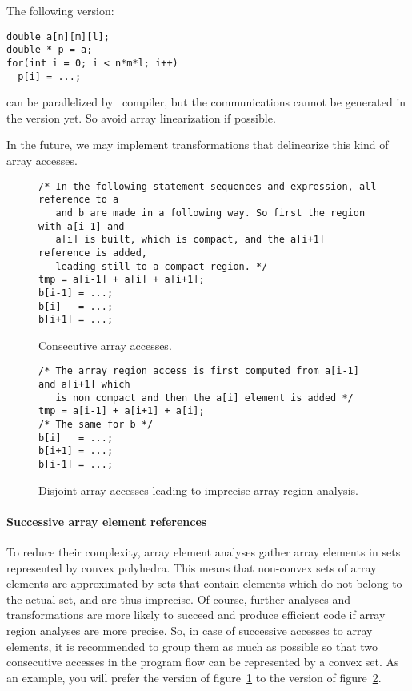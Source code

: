 \documentclass[a4paper]{article}
\begin{document}
The following version:
\begin{lstlisting}
double a[n][m][l];
double * p = a;
for(int i = 0; i < n*m*l; i++)
  p[i] = ...;
\end{lstlisting}
can be parallelized by \Apfa\ \Aopenmp compiler, but the
communications cannot be generated in the \Agpu version yet. So avoid
array linearization if possible.

In the future, we may implement transformations that delinearize this kind
of array accesses.

\begin{figure}
  \centering
  \begin{lstlisting}
/* In the following statement sequences and expression, all reference to a
   and b are made in a following way. So first the region with a[i-1] and
   a[i] is built, which is compact, and the a[i+1] reference is added,
   leading still to a compact region. */
tmp = a[i-1] + a[i] + a[i+1];
b[i-1] = ...;
b[i]   = ...;
b[i+1] = ...;
  \end{lstlisting}
  \caption{Consecutive array accesses.}
  \label{fig:consecutive_array_accesses}
\end{figure}

\begin{figure}
  \centering
  \begin{lstlisting}
/* The array region access is first computed from a[i-1] and a[i+1] which
   is non compact and then the a[i] element is added */
tmp = a[i-1] + a[i+1] + a[i];
/* The same for b */
b[i]   = ...;
b[i+1] = ...;
b[i-1] = ...;
  \end{lstlisting}
  \caption{Disjoint array accesses leading to imprecise array region
    analysis.}
  \label{fig:disjoint_array_accesses}
\end{figure}


\paragraph{Successive array element references}

To reduce their complexity, array element analyses gather array elements in
sets represented by convex polyhedra. This means that non-convex sets
of array elements are approximated by sets that contain elements which
do not belong to the actual set, and are thus imprecise. Of course,
further analyses and transformations are more likely to succeed and
produce efficient code if array region analyses are more precise. So,
in case of successive accesses to array elements, it is recommended to
group them as much as possible so that two consecutive accesses in the
program flow can be represented by a convex set. As an example, you
will prefer the version of figure~\ref{fig:consecutive_array_accesses}
to the version of figure~\ref{fig:disjoint_array_accesses}.
\end{document}
